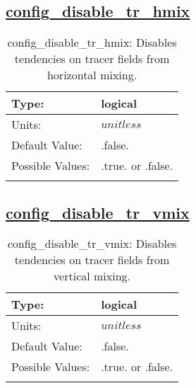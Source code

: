\subsection[config\_disable\_tr\_hmix]{\hyperref[sec:nm_tab_debug]{config\_disable\_tr\_hmix}}
\label{subsec:nm_sec_config_disable_tr_hmix}
\begin{center}
\begin{longtable}{| p{2.0in} | p{4.0in} |}
    \hline
    Type: & logical \\
    \hline
    Units: & $unitless$ \\
    \hline
    Default Value: & .false. \\
    \hline
    Possible Values: & .true. or .false. \\
    \hline
    \caption{config\_disable\_tr\_hmix: Disables tendencies on tracer fields from horizontal mixing.}
\end{longtable}
\end{center}
\subsection[config\_disable\_tr\_vmix]{\hyperref[sec:nm_tab_debug]{config\_disable\_tr\_vmix}}
\label{subsec:nm_sec_config_disable_tr_vmix}
\begin{center}
\begin{longtable}{| p{2.0in} | p{4.0in} |}
    \hline
    Type: & logical \\
    \hline
    Units: & $unitless$ \\
    \hline
    Default Value: & .false. \\
    \hline
    Possible Values: & .true. or .false. \\
    \hline
    \caption{config\_disable\_tr\_vmix: Disables tendencies on tracer fields from vertical mixing.}
\end{longtable}
\end{center}

